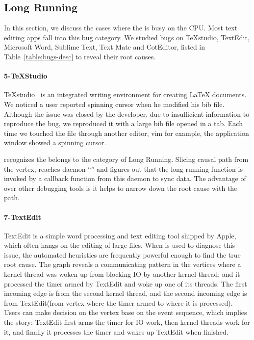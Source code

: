 \subsection{Long Running}

In this section, we discuss the cases where the \spinningnode is busy on the
CPU. Most text editing apps fall into this bug category. We studied bugs on
TeXstudio, TextEdit, Microsoft Word, Sublime Text, Text Mate and CotEditor,
listed in Table~\ref{table:bugs-desc} to reveal their root causes.


\paragraph{5-TeXStudio}

TeXstudio~\cite{TeXStudio} is an integrated writing environment for creating
LaTeX documents. We noticed a user reported spinning cursor when he
modified his bib file. Although the issue was closed by the developer, due to
insufficient information to reproduce the bug, we reproduced it with a large bib
file opened in a tab. Each time we touched the file through another editor, vim
for example, the application window showed a spinning cursor.

\xxx recognizes the \spinningnode belongs to the category of Long
Running. Slicing causal path from the vertex, \xxx reaches daemon
``'' and figures out that the long-running function is invoked by a callback
function from this daemon to sync data. The advantage of \xxx over other debugging tools is
it helps to narrow down the root cause with the path.

\paragraph{7-TextEdit}

TextEdit is a simple word processing and text editing tool shipped by Apple, which
often hangs on the editing of large files. 
When \xxx is used to diagnose this issue, the automated heuristics are frequently
powerful enough to find the true root cause.
The graph reveals a communicating pattern in the vertices where a kernel
thread was woken up from blocking IO by another kernel thread; and it processed
the timer armed by TextEdit and woke up one of its threads. The first incoming
edge is from the second kernel thread, and the second incoming edge is from
TextEdit(from vertex where the timer armed to where it is processed). Users can
make decision on the vertex base on the event sequence, which implies the story:
TextEdit first arms the timer for IO work, then kernel threads work for it, and
finally it processes the timer and wakes up TextEdit when finished.

